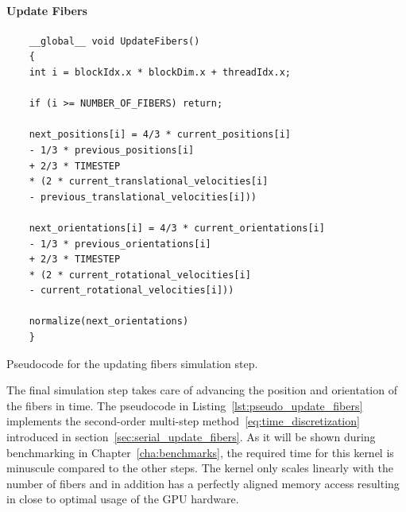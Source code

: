 
\paragraph{Update Fibers}

\begin{listing}[!htbp]
  \centering
  \begin{verbatim}
    __global__ void UpdateFibers()
    {
    int i = blockIdx.x * blockDim.x + threadIdx.x;

    if (i >= NUMBER_OF_FIBERS) return;

    next_positions[i] = 4/3 * current_positions[i]
    - 1/3 * previous_positions[i]
    + 2/3 * TIMESTEP
    * (2 * current_translational_velocities[i]
    - previous_translational_velocities[i]))

    next_orientations[i] = 4/3 * current_orientations[i]
    - 1/3 * previous_orientations[i]
    + 2/3 * TIMESTEP
    * (2 * current_rotational_velocities[i]
    - current_rotational_velocities[i]))

    normalize(next_orientations)
    }
  \end{verbatim}
  \caption{Pseudocode for the updating fibers simulation step.}
  \label{lst:pseudo_update_fibers}
\end{listing}

The final simulation step takes care of advancing the position and orientation of the fibers in time. The pseudocode in Listing~\ref{lst:pseudo_update_fibers} implements the second-order multi-step method~\eqref{eq:time_discretization} introduced in section~\ref{sec:serial_update_fibers}. As it will be shown during benchmarking in Chapter~\ref{cha:benchmarks}, the required time for this kernel is minuscule compared to the other steps. The kernel only scales linearly with the number of fibers and in addition has a perfectly aligned memory access resulting in close to optimal usage of the GPU hardware.

